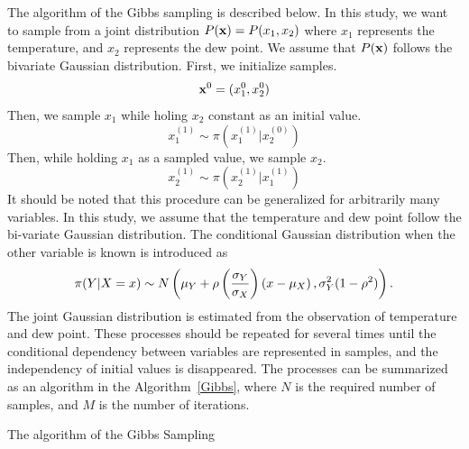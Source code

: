 \documentclass[journal]{IEEEtran} %
\begin{document}
The algorithm of the Gibbs sampling is described below. In this study, we want to sample from a joint distribution $P({\bf{x}}) = P({x_1},{x_2})$ where $x_1$ represents the temperature, and $x_2$ represents the dew point. We assume that $P({\bf{x}})$ follows the bivariate Gaussian distribution.
First, we initialize samples.
\begin{equation}
\label{Initialize}
{{\bf{x}}^0} = ({x_1^0},{x_2^0})
\end{equation}
Then, we sample $x_1$ while holing $x_2$ constant as an initial value.
\begin{equation}
\label{X1sample}
x_1^{(1)} \sim \pi (x_1^{(1)}|x_2^{(0)})
\end{equation}
Then, while holding $x_1$ as a sampled value, we sample $x_2$. 
\begin{equation}
\label{X1sample}
x_2^{(1)} \sim \pi (x_2^{(1)}|x_1^{(1)})
\end{equation}
It should be noted that this procedure can be generalized for arbitrarily many variables.
In this study, we assume that the temperature and dew point follow the bi-variate Gaussian distribution. The conditional Gaussian distribution when the other variable is known is introduced as
\begin{equation}
\label{ConditionalDist}
\small
\begin{aligned}
\pi(Y|X = x) \sim N\left( {{\mu _Y} + \rho \left( {\frac{{{\sigma _Y}}}{{{\sigma _X}}}} \right)\left( {x - {\mu _X}} \right),\sigma _Y^2(1 - {\rho ^2})} \right).
\end{aligned}
\end{equation}
The joint Gaussian distribution is estimated from the observation of temperature and dew point.
%
These processes should be repeated for several times until the conditional dependency between variables are represented in samples, and the independency of initial values is disappeared. The processes can be summarized as an algorithm in the Algorithm~\ref{Gibbs}, where $N$ is the required number of samples, and $M$ is the number of iterations.
\begin{algorithm}[t!]
\label{Gibbs}
 \caption{The algorithm of the Gibbs Sampling }
\end{algorithm}
\end{document}
